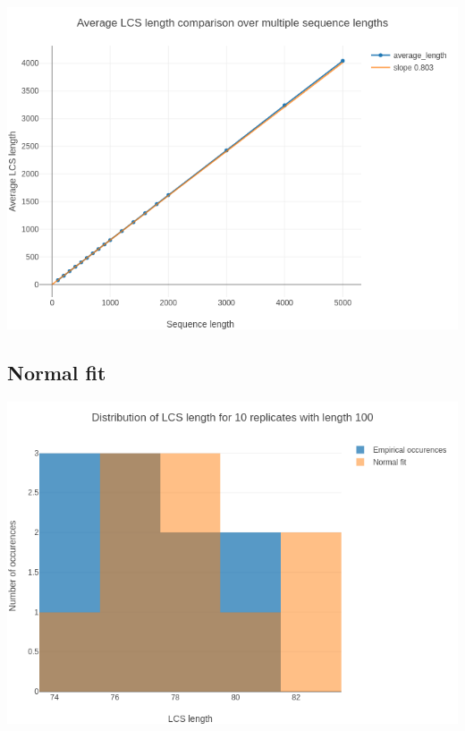 \documentclass{beamer}
\begin{document}
\begin{frame}
  \includegraphics[width=\textwidth]{img/lcs_lengths_comparison.png}
\end{frame}

\subsection{Normal fit}
\begin{frame}
  \includegraphics[width=\textwidth]{img/comparison_normal_rep10.png}
\end{frame}
\end{document}

